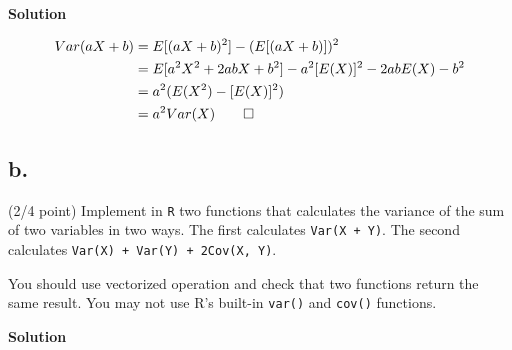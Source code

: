 \documentclass{article}\usepackage[]{graphicx}\usepackage[]{color}
\begin{document}
\textbf{Solution}

\begin{align}
Var(aX + b) &= E[(aX + b)^2] - (E[(aX + b)])^2 \\
&= E[a^2X^2 + 2abX + b^2] - a^2[E(X)]^2 - 2abE(X)- b^2 \\
&= a^2(E(X^2) - [E(X)]^2) \\
&= a^2 Var(X) \qed
\end{align}

\subsection*{b.} (2/4 point) Implement in \verb`R` two functions that calculates the variance of the sum of two variables in two ways. The first calculates \verb`Var(X + Y)`. The second calculates \verb`Var(X) + Var(Y) + 2Cov(X, Y)`.

You should use vectorized operation and check that two functions return the same result. You may not use R's built-in \verb`var()` and \verb`cov()` functions.

\textbf{Solution}
\end{document}
